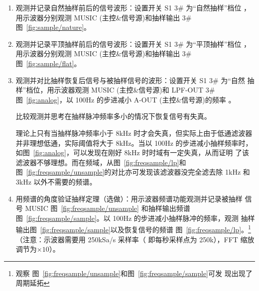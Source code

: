 \documentclass[../main]{subfiles}
\begin{document}
  \begin{enumerate}
    \item 观测并记录自然抽样前后的信号波形：设置开关 S1 3\# 为“自然抽样”档位
      ，用示波器分别观测 MUSIC (主控\&信号源)和抽样输出 3\#
      图~\ref{fig:sample/nature}。
    \item 观测并记录平顶抽样前后的信号波形：设置开关 S1 3\# 为“平顶抽样”档位
      ，用示波器分别观测 MUSIC (主控\&信号源)和抽样输出 3\#
      图~\ref{fig:sample/flat}。
    \item 观测并对比抽样恢复后信号与被抽样信号的波形：设置开关 S1 3\# 为“自然
      抽样”档位，用示波器观测 MUSIC (主控\&信号源)和 LPF-OUT
      3\# 图~\ref{fig:analog}，以 100Hz 的步进减小 A-OUT (主控\&信号源)的频率
      。

      \begin{Exercise}[title = 思考]
        比较观测并思考在抽样脉冲频率多小的情况下恢复信号有失真。
      \end{Exercise}

      \begin{Answer}
        理论上只有当抽样脉冲频率小于 8kHz 时才会失真，但实际上由于低通滤波器
        并非理想低通，实际阈值将大于 8kHz。当以 100Hz 的步进减小抽样频率时，
        如图~\ref{fig:analog}，可以发现在刚好 8kHz 时时域有一定失真，从而证明
        了该滤波器不够理想。而在频域，从图~\ref{fig:freqsample/lp}和
        图~\ref{fig:freqsample/unsample}的对比亦可发现该滤波器没完全滤去除
        1kHz 和 3kHz 以外不需要的频谱。
      \end{Answer}

    \item 用频谱的角度验证抽样定理（选做）：用示波器频谱功能观测并记录被抽样
      信号 MUSIC 图~\ref{fig:freqsample/unsample} 和抽样输出频谱
      图~\ref{fig:freqsample/sample}。以 100Hz 的步进减小抽样脉冲的频率，观测
      抽样输出图~\ref{fig:freqsample/sample}以及恢复信号的频谱
      图~\ref{fig:freqsample/lp}。\footnote{观察
        图~\ref{fig:freqsample/unsample}和图~\ref{fig:freqsample/sample}可发
      现出现了周期延拓}（注意：示波器需要用 250kSa/s 采样率（
      即每秒采样点为 250k），FFT 缩放调节为$\times 10$）。
  \end{enumerate}
\end{document}

